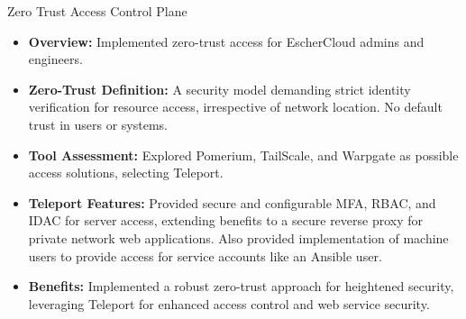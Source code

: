 \documentclass[10pt]{beamer}
\begin{document}
  \begin{frame}{Zero Trust Access Control Plane}
    \begin{itemize}
      \item \textbf{Overview:} Implemented zero-trust access for EscherCloud admins
      and engineers.
  
      \item \textbf{Zero-Trust Definition:} A security model demanding strict
      identity verification for resource access, irrespective of network location.
      No default trust in users or systems.
  
      \item \textbf{Tool Assessment:} Explored Pomerium, TailScale, and Warpgate
      as possible access solutions, selecting Teleport.
  
      \item \textbf{Teleport Features:} Provided secure and configurable MFA, RBAC,
      and IDAC for server access, extending benefits to a secure reverse proxy for
      private network web applications. Also provided implementation of machine users
      to provide access for service accounts like an Ansible user.
  
      \item \textbf{Benefits:} Implemented a robust zero-trust approach for heightened
      security, leveraging Teleport for enhanced access control and web service
      security.
    \end{itemize}
  \end{frame}
\end{document}
